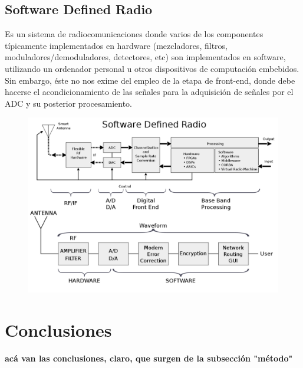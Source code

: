\documentclass{article}
\begin{document}
{\subsection{Software Defined Radio}
Es un sistema de radiocomunicaciones donde varios de los componentes típicamente implementados en hardware (mezcladores, filtros, moduladores/demoduladores, detectores, etc) son implementados en software, utilizando un ordenador personal u otros dispositivos de computación embebidos.  
Sin embargo, éste no nos exime del empleo de la etapa de front-end, donde debe hacerse el acondicionamiento de las señales para la adquisición de señales por el ADC y su posterior procesamiento. 
\begin{figure}[H]
  \centering
    \includegraphics[scale=0.3]{SDR}
  \caption{  }
\end{figure}
}%











\section{Conclusiones}

\textbf{acá van las conclusiones, claro, que surgen de la subsección "método"}
\end{document}
